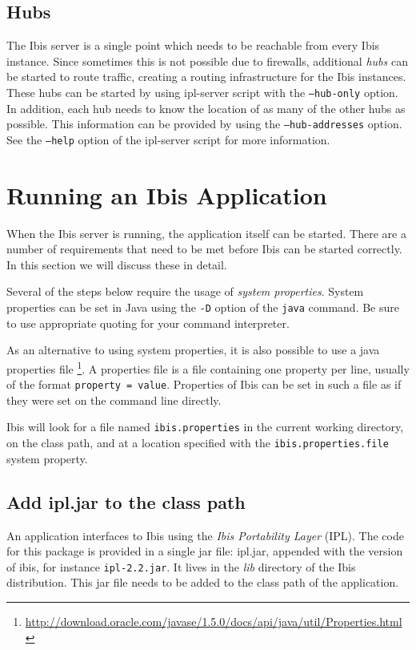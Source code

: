 \documentclass[a4paper,10pt]{article}
\begin{document}
\subsection{Hubs}
\label{hubs}

The Ibis server is a single point which needs to be reachable from every
Ibis instance. Since sometimes this is not possible due to firewalls,
additional \emph{hubs} can be started to route traffic, creating a
routing infrastructure for the Ibis instances. These hubs can be started
by using ipl-server script with the \texttt{--hub-only} option. In
addition, each hub needs to know the location of as many of the other
hubs as possible. This information can be provided by using the
\texttt{--hub-addresses} option. See the \texttt{--help} option of the
ipl-server script for more information.

\section{Running an Ibis Application}

When the Ibis server is running, the application itself can be
started. There are a number of requirements that need to be met before 
Ibis can be started correctly. In this section we will discuss these in detail.

Several of the steps below require the usage of \emph{system properties}. 
System properties can be set in Java using the \texttt{-D} option of the 
\texttt{java} command. Be sure to use appropriate quoting for your
command interpreter.

As an alternative to using system properties, it is also possible to use
a java properties file
\footnote{\url{http://download.oracle.com/javase/1.5.0/docs/api/java/util/Properties.html}}.
A properties file is a file containing one property per line, usually of
the format \texttt{property = value}. Properties of Ibis can be set in
such a file as if they were set on the command line directly.

Ibis will look for a file named \texttt{ibis.properties} in the current working
directory, on the class path, and at a location specified with the
\texttt{ibis.properties.file} system property.

\subsection{Add ipl.jar to the class path}

An application interfaces to Ibis using the \emph{Ibis Portability Layer} (IPL).
The code for this package is provided in a single jar file:
ipl.jar, appended with the version of ibis, for instance \texttt{ipl-2.2.jar}.
It lives in the \emph{lib} directory of the Ibis distribution.
This jar file needs to be added to the class path of the application.
\end{document}
